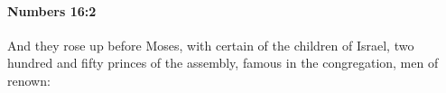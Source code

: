 
		\paragraph{Numbers 16:2} %
			\label{NUMBERS-16-2}

			And they rose up before Moses, with certain of the children of Israel, two hundred and fifty princes of the assembly, famous in the congregation, men of renown:


